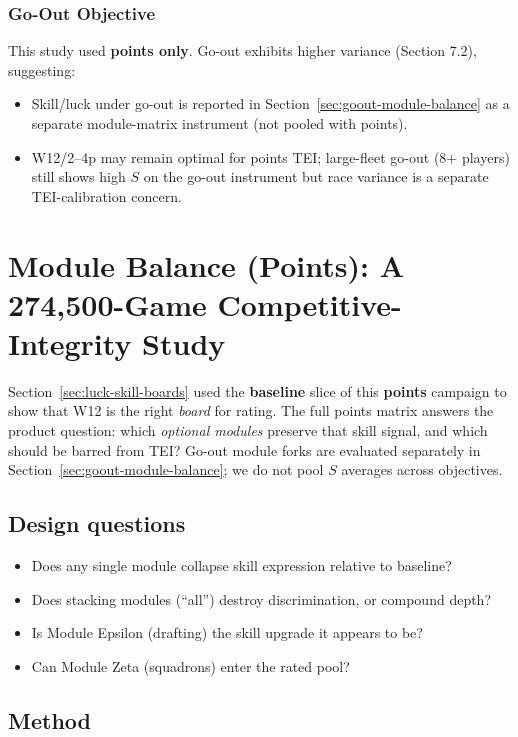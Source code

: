\documentclass[11pt,letterpaper]{article}
\begin{document}
\subsubsection{Go-Out Objective}

This study used \textbf{points only}. Go-out exhibits higher variance (Section 7.2), suggesting:
\begin{itemize}
\item Skill/luck under go-out is reported in Section~\ref{sec:goout-module-balance} as a separate module-matrix instrument (not pooled with points).
\item W12/2--4p may remain optimal for points TEI; large-fleet go-out (8+ players) still shows high $S$ on the go-out instrument but race variance is a separate TEI-calibration concern.
\end{itemize}

\section{Module Balance (Points): A 274{,}500-Game Competitive-Integrity Study}
\label{sec:module-balance}

Section~\ref{sec:luck-skill-boards} used the \textbf{baseline} slice of this \textbf{points} campaign to show that W12 is the right \emph{board} for rating. The full points matrix answers the product question: which \emph{optional modules} preserve that skill signal, and which should be barred from TEI? Go-out module forks are evaluated separately in Section~\ref{sec:goout-module-balance}; we do not pool $S$ averages across objectives.

\subsection{Design questions}
\begin{itemize}
\item Does any single module collapse skill expression relative to baseline?
\item Does stacking modules (``all'') destroy discrimination, or compound depth?
\item Is Module Epsilon (drafting) the skill upgrade it appears to be?
\item Can Module Zeta (squadrons) enter the rated pool?
\end{itemize}

\subsection{Method}
\label{sec:module-instrument}
\end{document}
